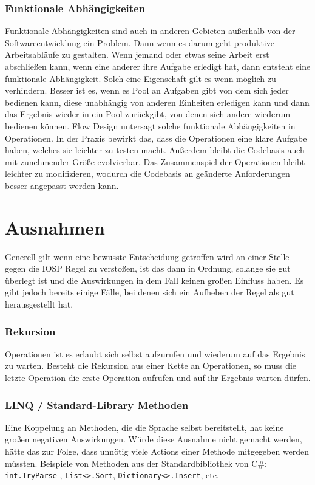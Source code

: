 \subsubsection{Funktionale Abhängigkeiten}

Funktionale Abhängigkeiten sind auch in anderen Gebieten außerhalb von der
Softwareentwicklung ein Problem. Dann wenn es darum geht produktive
Arbeitsabläufe zu gestalten.
Wenn jemand oder etwas seine Arbeit erst abschließen kann, wenn eine anderer
ihre Aufgabe erledigt hat, dann entsteht eine funktionale Abhängigkeit.
Solch eine Eigenschaft gilt es wenn möglich zu verhindern.
Besser ist es, wenn es Pool an Aufgaben gibt von dem sich jeder bedienen kann,
diese unabhängig von anderen Einheiten erledigen kann und dann das Ergebnis wieder
in ein Pool zurückgibt, von denen sich andere wiederum bedienen können.
Flow Design untersagt solche funktionale Abhängigkeiten in Operationen.
In der Praxis bewirkt das, dass die Operationen eine klare Aufgabe haben, welches
sie leichter zu testen macht.
Außerdem bleibt die Codebasis auch mit zunehmender Größe evolvierbar. Das
Zusammenspiel der Operationen bleibt leichter zu modifizieren, wodurch die
Codebasis an geänderte Anforderungen besser angepasst werden kann.

\section{Ausnahmen}

Generell gilt  wenn eine bewusste Entscheidung getroffen wird an einer Stelle gegen die IOSP
Regel zu verstoßen, ist das dann in Ordnung, solange sie gut überlegt ist und
die Auswirkungen in dem Fall keinen großen Einfluss haben.
Es gibt jedoch bereits einige Fälle, bei denen sich ein Aufheben der Regel als gut
herausgestellt hat.
\subsubsection{Rekursion}

Operationen ist es erlaubt sich selbst aufzurufen und wiederum auf das Ergebnis
zu warten. Besteht die Rekursion aus einer Kette an Operationen, so muss die letzte
Operation die erste Operation aufrufen und auf ihr Ergebnis warten dürfen.
\subsubsection{LINQ / Standard-Library Methoden}

Eine Koppelung an Methoden, die die Sprache selbst bereitstellt, hat keine
großen negativen Auswirkungen. Würde diese Ausnahme nicht gemacht werden, hätte
das zur Folge, dass unnötig viele Actions einer Methode mitgegeben werden
müssten. Beispiele von Methoden aus der Standardbibliothek von C\#:
\texttt{int.TryParse} , \texttt{List<>.Sort}, \texttt{Dictionary<>.Insert}, etc.

